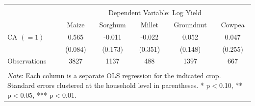 \begin{tabular}{l*{5}{c}} 
\\[-1.8ex]\hline \hline \\[-1.8ex] 
& \multicolumn{5}{c}{Dependent Variable: 
Log Yield} \\ \midrule
                    &\multicolumn{1}{c}{Maize}&\multicolumn{1}{c}{Sorghum}&\multicolumn{1}{c}{Millet}&\multicolumn{1}{c}{Groundnut}&\multicolumn{1}{c}{Cowpea}\\
\midrule
\hspace{0.1cm} CA $(=1)$&       0.565\sym{***}&      -0.011         &      -0.022         &       0.052         &       0.047         \\
                    &     (0.084)         &     (0.173)         &     (0.351)         &     (0.148)         &     (0.255)         \\
\midrule
Observations        &        3827         &        1137         &         488         &        1397         &         667         \\
\hline \hline \\[-1.8ex] 
\multicolumn{6}{p{\linewidth}}{\small 
\noindent \textit{Note}: Each column is a 
separate OLS regression for the indicated 
crop. Standard errors clustered at the 
household level in parentheses. 
* p$<$0.10, ** p$<$0.05, *** p$<$0.01.} 
\end{tabular}
